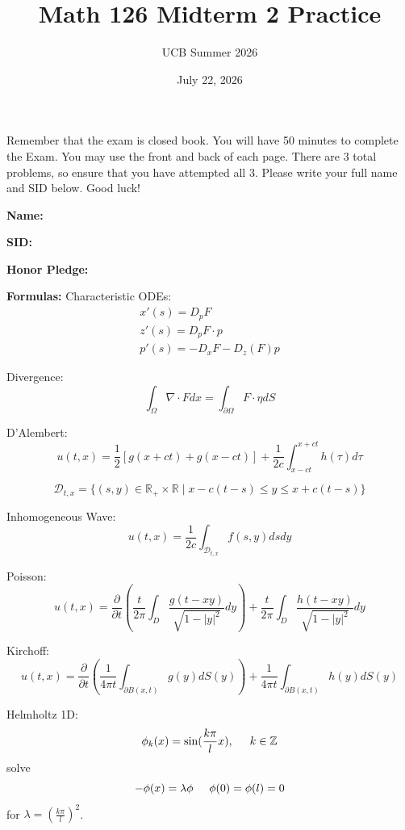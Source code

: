 \documentclass{article}
\newcommand{\Z}{{\mathbb{Z}}}
\newcommand{\R}{{\mathbb{R}}}
\newcommand{\pd}{\partial}
\begin{document}
\title{Math 126 Midterm 2 Practice}
\author{UCB Summer 2026}
\date{July 22, 2026}
\maketitle

Remember that the exam is closed book. You will have 50 minutes to complete the Exam. You may use the front and back of each page. There are 3 total problems, so ensure that you have attempted all 3. Please write your full name and SID below. Good luck!

\vspace{1 cm}

\textbf{Name:} 

\vspace{1 cm}

\textbf{SID:}

\vspace{1 cm}

\textbf{Honor Pledge:}

\vspace{1 cm}

\textbf{Formulas:}
Characteristic ODEs: 
\begin{align*}
	x'(s) = D_p F \\
	z'(s) = D_p F \cdot p \\
	p'(s) = -D_{x} F - D_{z}(F) p
\end{align*}

Divergence: $$\int_{\Omega} \nabla \cdot F dx = \int_{\pd \Omega} F \cdot \eta dS$$

D'Alembert: $$u(t,x) = \frac{1}{2} \left[g(x+ct) + g(x-ct) \right] + \frac{1}{2c} \int_{x-ct}^{x+ct} h(\tau) d\tau $$

$$\mathcal{D}_{t,x} = \{ (s,y) \in \R_{+} \times \R \mid x-c(t-s) \leq y \leq x+c(t-s)\}$$

Inhomogeneous Wave: $$u(t,x) = \frac{1}{2c} \int_{\mathcal{D}_{t,x}} f(s,y) dsdy$$

Poisson: $$u(t,x) = \frac{\pd}{\pd t} \left( \frac{t}{2\pi} \int_{D} \frac{g(t-xy)}{\sqrt{1 - |y|^{2}}} dy\right) + \frac{t}{2\pi} \int_{D} \frac{h(t-xy)}{\sqrt{1-|y|^{2}}} dy$$

Kirchoff: $$ u(t,x) = \frac{\pd}{\pd t} \left(\frac{1}{4 \pi t} \int_{\pd B(x,t)} g(y) dS(y) \right) + \frac{1}{4\pi t} \int_{\pd B(x,t)} h(y) dS(y)$$

Helmholtz 1D: $$\phi_{k}(x) = \sin(\frac{k\pi}{l}x), \hspace{0.5 cm} k \in \Z$$
solve $$-\phi(x) = \lambda \phi \hspace{0.5 cm} \phi(0) = \phi(l) = 0$$ for $\lambda = (\frac{k\pi}{l})
^{2}$.
\end{document}
